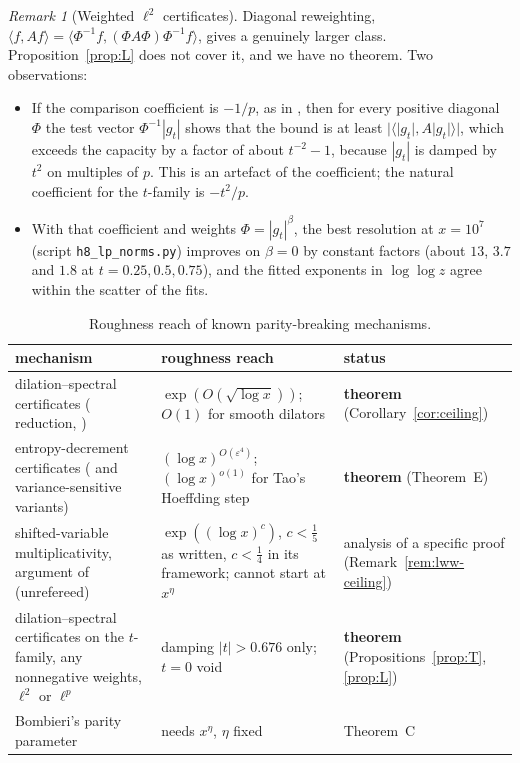 \documentclass[11pt]{amsart}
\theoremstyle{definition}
\theoremstyle{remark}
\newtheorem{remark}[theorem]{Remark}
\begin{document}
\begin{remark}[Weighted $\ell^2$ certificates]
Diagonal reweighting, $\langle f,Af\rangle=\langle\Phi^{-1}f,(\Phi A\Phi)\Phi^{-1}f\rangle$, gives a genuinely larger class. Proposition~\ref{prop:L} does not cover it, and we have no theorem. Two observations:
\begin{itemize}
\item If the comparison coefficient is $-1/p$, as in \cite{HR21}, then for every positive diagonal $\Phi$ the test vector $\Phi^{-1}|g_t|$ shows that the bound is at least $|\langle|g_t|,A|g_t|\rangle|$, which exceeds the capacity by a factor of about $t^{-2}-1$, because $|g_t|$ is damped by $t^2$ on multiples of $p$. This is an artefact of the coefficient; the natural coefficient for the $t$-family is $-t^2/p$.
\item With that coefficient and weights $\Phi=|g_t|^\beta$, the best resolution at $x=10^7$ (script \texttt{h8\_lp\_norms.py}) improves on $\beta=0$ by constant factors (about $13$, $3.7$ and $1.8$ at $t=0.25,0.5,0.75$), and the fitted exponents in $\log\log z$ agree within the scatter of the fits.
\end{itemize}
\end{remark}

\begin{table}[h]
\centering
\small
\begin{tabular}{p{3.6cm}p{4.2cm}p{4.6cm}}
\toprule
mechanism & roughness reach & status\\
\midrule
dilation--spectral certificates (\cite{Tao16} reduction, \cite{HR21,Pil23}) & $\exp(O(\sqrt{\log x}))$; $O(1)$ for smooth dilators & \textbf{theorem} (Corollary~\ref{cor:ceiling})\\
entropy-decrement certificates (\cite[\S3]{Tao16} and variance-sensitive variants) & $(\log x)^{O(\varepsilon^4)}$; $(\log x)^{o(1)}$ for Tao's Hoeffding step & \textbf{theorem} (Theorem~E)\\
shifted-variable multiplicativity, argument of \cite{LWW26} (unrefereed) & $\exp((\log x)^{c})$, $c<\frac15$ as written, $c<\frac14$ in its framework; cannot start at $x^\eta$ & analysis of a specific proof (Remark~\ref{rem:lww-ceiling})\\
dilation--spectral certificates on the $t$-family, any nonnegative weights, $\ell^2$ or $\ell^p$ & damping $|t|>0.676$ only; $t=0$ void & \textbf{theorem} (Propositions~\ref{prop:T}, \ref{prop:L})\\
\midrule
Bombieri's parity parameter & needs $x^\eta$, $\eta$ fixed & Theorem~C\\
\bottomrule
\end{tabular}
\caption{Roughness reach of known parity-breaking mechanisms.}
\label{tab:ceiling}
\end{table}
\end{document}
